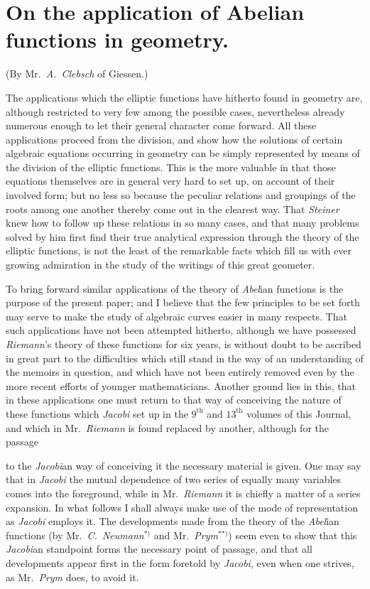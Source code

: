 \documentclass{article}
\begin{document}
\section*{On the application of Abelian functions in geometry.}

(By Mr.\ \emph{A.\ Clebsch} of Giessen.)

The applications which the elliptic functions have hitherto found in geometry are, although restricted to very few among the possible cases, nevertheless already numerous enough to let their general character come forward. All these applications proceed from the division, and show how the solutions of certain algebraic equations occurring in geometry can be simply represented by means of the division of the elliptic functions. This is the more valuable in that those equations themselves are in general very hard to set up, on account of their involved form; but no less so because the peculiar relations and groupings of the roots among one another thereby come out in the clearest way. That \emph{Steiner} knew how to follow up these relations in so many cases, and that many problems solved by him first find their true analytical expression through the theory of the elliptic functions, is not the least of the remarkable facts which fill us with ever growing admiration in the study of the writings of this great geometer.

To bring forward similar applications of the theory of \emph{Abel}ian functions is the purpose of the present paper; and I believe that the few principles to be set forth may serve to make the study of algebraic curves easier in many respects. That such applications have not been attempted hitherto, although we have possessed \emph{Riemann}'s theory of these functions for six years, is without doubt to be ascribed in great part to the difficulties which still stand in the way of an understanding of the memoirs in question, and which have not been entirely removed even by the more recent efforts of younger mathematicians. Another ground lies in this, that in these applications one must return to that way of conceiving the nature of these functions which \emph{Jacobi} set up in the $9^{\text{th}}$ and $13^{\text{th}}$ volumes of this Journal, and which in Mr.\ \emph{Riemann} is found replaced by another, although for the passage

to the \emph{Jacobi}an way of conceiving it the necessary material is given. One may say that in \emph{Jacobi} the mutual dependence of two series of equally many variables comes into the foreground, while in Mr.\ \emph{Riemann} it is chiefly a matter of a series expansion. In what follows I shall always make use of the mode of representation as \emph{Jacobi} employs it. The developments made from the theory of the \emph{Abel}ian functions (by Mr.\ \emph{C.\ Neumann}${}^{*)}$ and Mr.\ \emph{Prym}${}^{**)}$) seem even to show that this \emph{Jacobi}an standpoint forms the necessary point of passage, and that all developments appear first in the form foretold by \emph{Jacobi}, even when one strives, as Mr.\ \emph{Prym} does, to avoid it.
\end{document}
